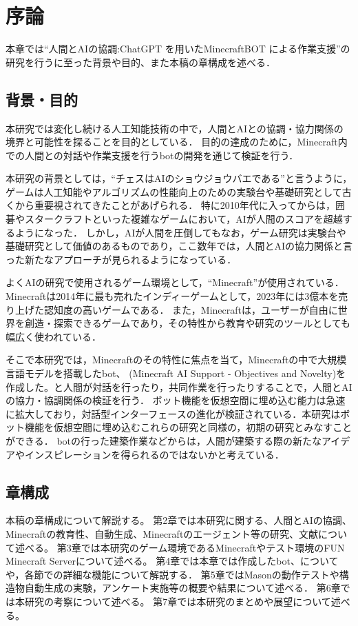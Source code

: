 \chapter{序論}	
\thispagestyle{plain}   %

本章では``人間とAIの協調:ChatGPT を用いたMinecraftBOT による作業支援''の研究を行うに至った背景や目的、また本稿の章構成を述べる．

\section{背景・目的}
本研究では変化し続ける人工知能技術の中で，人間とAIとの協調・協力関係の境界と可能性を探ることを目的としている．
目的の達成のために，Minecraft内での人間との対話や作業支援を行うbotの開発を通じて検証を行う．

本研究の背景としては，``チェスはAIのショウジョウバエである''\cite{bib:chess}と言うように，ゲームは人工知能やアルゴリズムの性能向上のための実験台や基礎研究として古くから重要視されてきたことがあげられる．
特に2010年代に入ってからは，囲碁やスタークラフトといった複雑なゲームにおいて，AIが人間のスコアを超越するようになった\cite{bib:AplpaGo,bibAlphaStar}．
しかし，AIが人間を圧倒してもなお，ゲーム研究は実験台や基礎研究として価値のあるものであり，ここ数年では，人間とAIの協力関係と言った新たなアプローチが見られるようになっている\cite{bib:maia,bib:craft_assist}．

よくAIの研究で使用されるゲーム環境として，``Minecraft''\cite{bib:Minecraft}が使用されている．
Minecraftは2014年に最も売れたインディーゲームとして，2023年には3億本を売り上げた認知度の高いゲームである\cite{bib:minecraft_news}．
また，Minecraftは，ユーザーが自由に世界を創造・探索できるゲームであり，その特性から教育や研究のツールとしても幅広く使われている．

そこで本研究では，Minecraftのその特性に焦点を当て，Minecraftの中で大規模言語モデルを搭載したbot、{\mason} (Minecraft AI Support - Objectives and Novelty)を作成した。{\mason}と人間が対話を行ったり，共同作業を行ったりすることで，人間とAIの協力・協調関係の検証を行う．
ボット機能を仮想空間に埋め込む能力は急速に拡大しており，対話型インターフェースの進化が検証されている．本研究はボット機能を仮想空間に埋め込むこれらの研究と同様の，初期の研究とみなすことができる．
botの行った建築作業などからは，人間が建築する際の新たなアイデアやインスピレーションを得られるのではないかと考えている．

\section{章構成}
本稿の章構成について解説する。
第2章では本研究に関する、人間とAIの協調、Minecraftの教育性、自動生成、Minecraftのエージェント等の研究、文献について述べる。
第3章では本研究のゲーム環境であるMinecraftやテスト環境のFUN Minecraft Serverについて述べる。
第4章では本章では作成したbot、{\mason}についてや，各節で{\mason}の詳細な機能について解説する．
第5章ではMasonの動作テストや構造物自動生成の実験，アンケート実施等の概要や結果について述べる．
第6章では本研究の考察について述べる。
第7章では本研究のまとめや展望について述べる。
